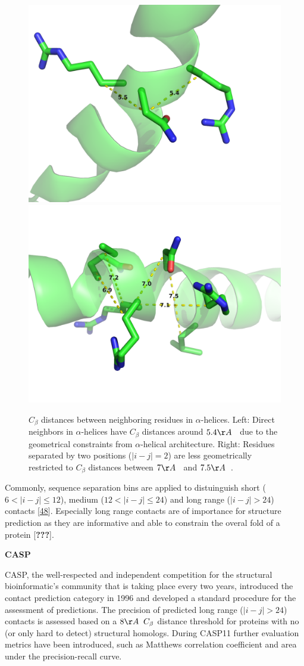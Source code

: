 \documentclass[12pt,a4paper,twoside]{book}
\newcommand{\Cb}{C_\beta}
\theoremstyle{definition}
\theoremstyle{definition}
\theoremstyle{remark}
\begin{document}
\begin{figure}
\includegraphics[width=0.5\linewidth]{img/dataset_statistics/cb_distribution_peak_5-6} \includegraphics[width=0.5\linewidth]{img/dataset_statistics/cb_distribution_peak_7} \caption{\(\Cb\) distances between
neighboring residues in \(\alpha\)-helices. Left: Direct neighbors in
\(\alpha\)-helices have \(\Cb\) distances around \(5.4\AA \; \;\) due to
the geometrical constraints from \(\alpha\)-helical architecture. Right:
Residues separated by two positions (\(|i-j| = 2\)) are less
geometrically restricted to \(\Cb\) distances between \(7\AA \; \;\) and
\(7.5\AA \; \;\).}\label{fig:peaks-Cb-distribution}
\end{figure}

Commonly, sequence separation bins are applied to distuinguish short
(\(6 < |i-j| \le 12\)), medium (\(12 < |i-j| \le 24\)) and long range
(\(|i-j| > 24\)) contacts
{[}\protect\hyperlink{ref-Monastyrskyy2015}{48}{]}. Especially long
range contacts are of importance for structure prediction as they are
informative and able to constrain the overal fold of a protein
{[}{\textbf{???}}{]}.

\textbf{CASP}

CASP, the well-respected and independent competition for the structural
bioinformatic's community that is taking place every two years,
introduced the contact prediction category in 1996 and developed a
standard procedure for the assessment of predictions. The precision of
predicted long range (\(|i-j| > 24\)) contacts is assessed based on a
\(8 \AA \; \; \Cb\) distance threshold for proteins with no (or only
hard to detect) structural homologs. During CASP11 further evaluation
metrics have been introduced, such as Matthews correlation coefficient
and area under the precision-recall curve.
\end{document}
